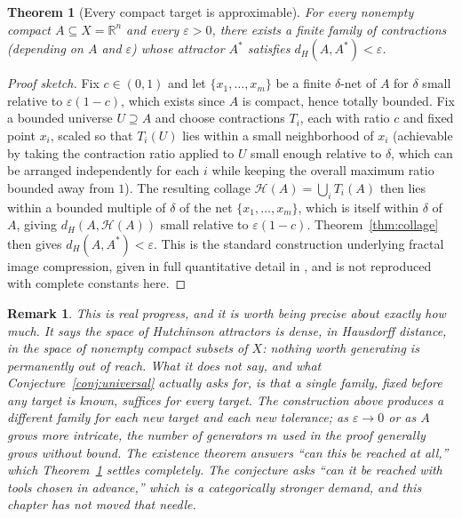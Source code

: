 \documentclass[11pt]{report}
\newtheorem{theorem}{Theorem}[chapter]
\newtheorem{remark}{Remark}[chapter]
\begin{document}
\begin{theorem}[Every compact target is approximable]
\label{thm:existence}
For every nonempty compact $A \subseteq X = \mathbb{R}^n$ and every
$\varepsilon > 0$, there exists a finite family of contractions
(depending on $A$ and $\varepsilon$) whose attractor $A^\ast$
satisfies $d_H(A, A^\ast) < \varepsilon$.
\end{theorem}
\begin{proof}[Proof sketch]
Fix $c \in (0,1)$ and let $\{x_1, \dots, x_m\}$ be a finite
$\delta$-net of $A$ for $\delta$ small relative to $\varepsilon(1-c)$,
which exists since $A$ is compact, hence totally bounded. Fix a
bounded universe $U \supseteq A$ and choose contractions $T_i$, each
with ratio $c$ and fixed point $x_i$, scaled so that $T_i(U)$ lies
within a small neighborhood of $x_i$ (achievable by taking the
contraction ratio applied to $U$ small enough relative to $\delta$,
which can be arranged independently for each $i$ while keeping the
overall maximum ratio bounded away from $1$). The resulting collage
$\mathcal{H}(A) = \bigcup_i T_i(A)$ then lies within a bounded
multiple of $\delta$ of the net $\{x_1,\dots,x_m\}$, which is itself
within $\delta$ of $A$, giving $d_H(A, \mathcal{H}(A))$ small relative
to $\varepsilon(1-c)$. Theorem~\ref{thm:collage} then gives $d_H(A,
A^\ast) < \varepsilon$. This is the standard construction underlying
fractal image compression, given in full quantitative detail in
\cite{barnsley1988}, and is not reproduced with complete constants
here.
\end{proof}

\begin{remark}
This is real progress, and it is worth being precise about exactly
how much. It says the space of Hutchinson attractors is dense, in
Hausdorff distance, in the space of nonempty compact subsets of $X$:
nothing worth generating is permanently out of reach. What it does
not say, and what Conjecture~\ref{conj:universal} actually asks for,
is that a \emph{single} family, fixed before any target is known,
suffices for every target. The construction above produces a
different family for each new target and each new tolerance; as
$\varepsilon \to 0$ or as $A$ grows more intricate, the number of
generators $m$ used in the proof generally grows without bound. The
existence theorem answers ``can this be reached at all,'' which
Theorem~\ref{thm:existence} settles completely. The conjecture asks
``can it be reached with tools chosen in advance,'' which is a
categorically stronger demand, and this chapter has not moved that
needle.
\end{remark}
\end{document}
